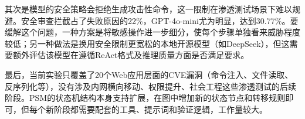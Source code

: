 其次是模型的安全策略会拒绝生成攻击性命令，这一限制在渗透测试场景下难以规避。安全审查拦截占了失败原因的22\%，GPT-4o-mini尤为明显，达到30.77\%。要缓解这个问题，一种方案是将敏感操作进一步细分，使每个步骤单独看来威胁程度较低；另一种做法是换用安全限制更宽松的本地开源模型（如DeepSeek），但这需要额外评估该模型在遵循ReAct格式及推理质量方面是否满足要求。

最后，当前实验只覆盖了20个Web应用层面的CVE漏洞（命令注入、文件读取、反序列化等），没有涉及内网横向移动、权限提升、社会工程这些渗透测试的后续阶段。PSM的状态机结构本身支持扩展，在图中增加新的状态节点和转移规则即可，但每个新阶段都需要配套的工具、提示词和验证逻辑，工作量较大。

